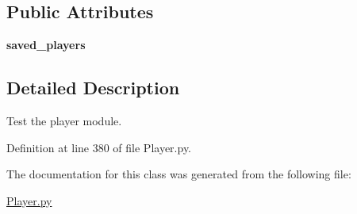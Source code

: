 \subsection*{\-Public \-Attributes}
\begin{DoxyCompactItemize}
\item 
\hypertarget{class_player_1_1_player_module_test_a1cea2dfbdc7ae954a94af20c112ecdd2}{
{\bfseries saved\-\_\-players}}
\label{class_player_1_1_player_module_test_a1cea2dfbdc7ae954a94af20c112ecdd2}

\end{DoxyCompactItemize}


\subsection{\-Detailed \-Description}
\-Test the player module. 

\-Definition at line 380 of file \-Player.\-py.



\-The documentation for this class was generated from the following file\-:\begin{DoxyCompactItemize}
\item 
\hyperlink{_player_8py}{\-Player.\-py}\end{DoxyCompactItemize}
